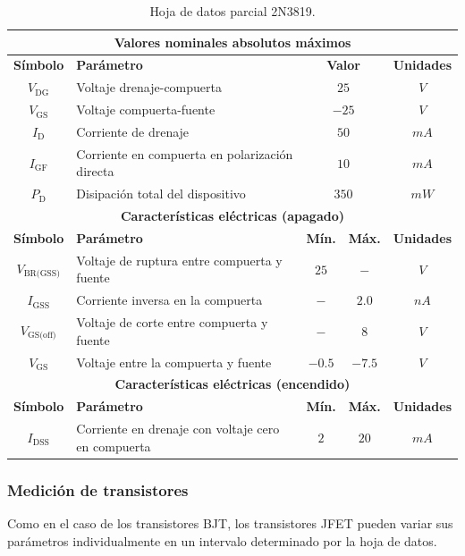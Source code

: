 \begin{table}[!ht]
\begin{center}
    \begin{tabular}{|c|l|c|c|c|}
    \hline
    \multicolumn{5}{|c|}{\textbf{Valores nominales absolutos máximos}}
    \tabularnewline \hline
    \textbf{Símbolo} &
    \textbf{Parámetro} &
    \multicolumn{2}{|c|}{\textbf{Valor}} &
    \textbf{Unidades}
    \tabularnewline \hline \hline
    $V_{\text{DG}}$ &
    Voltaje drenaje-compuerta &
    \multicolumn{2}{|c|}{$25$} & $V$
    \tabularnewline \hline
    $V_{\text{GS}}$ &
    Voltaje compuerta-fuente &
    \multicolumn{2}{|c|}{$-25$} &
    $V$
    \tabularnewline \hline
    $I_{\text{D}}$ &
    Corriente de drenaje &
    \multicolumn{2}{|c|}{$50$} &
    $mA$
    \tabularnewline \hline
    $I_{\text{GF}}$ &
    Corriente en compuerta en polarización directa &
    \multicolumn{2}{|c|}{$10$} &
    $mA$
    \tabularnewline \hline
    $P_{\text{D}}$ &
    Disipación total del dispositivo &
    \multicolumn{2}{|c|}{$350$} &
    $mW$
    \tabularnewline \hline \hline
    \multicolumn{5}{|c|}{\textbf{Características eléctricas (apagado)}}
    \tabularnewline \hline
    \textbf{Símbolo} &
    \textbf{Parámetro} &
    \textbf{Mín.} &
    \textbf{Máx.} &
    \textbf{Unidades}
    \tabularnewline \hline \hline
    $V_{\text{BR(GSS)}}$ &
    Voltaje de ruptura entre compuerta y fuente &
    $25$ &
    $-$ &
    $V$
    \tabularnewline \hline
    $I_{\text{GSS}}$ &
    Corriente inversa en la compuerta &
    $-$ &
    $2.0$ &
    $nA$
    \tabularnewline \hline
    $V_{\text{GS(off)}}$ &
    Voltaje de corte entre compuerta y fuente &
    $-$ &
    $8$ &
    $V$
    \tabularnewline \hline
    $V_{\text{GS}}$ &
    Voltaje entre la compuerta y fuente &
    $-0.5$ &
    $-7.5$ &
    $V$
    \tabularnewline \hline \hline
    \multicolumn{5}{|c|}{\textbf{Características eléctricas (encendido)}}
    \tabularnewline \hline
    \textbf{Símbolo} &
    \textbf{Parámetro} &
    \textbf{Mín.} &
    \textbf{Máx.} &
    \textbf{Unidades}
    \tabularnewline \hline \hline
    $I_{\text{DSS}}$ &
    Corriente en drenaje con voltaje cero en compuerta &
    $2$ &
    $20$ &
    $mA$
    \tabularnewline \hline
    \end{tabular}
\end{center}
\caption{Hoja de datos parcial 2N3819.}
\label{cuadro04}
\end{table}

\subsubsection{Medición de transistores}
Como en el caso de los transistores BJT, los transistores JFET pueden variar sus
parámetros individualmente en un intervalo determinado por la hoja de datos.


